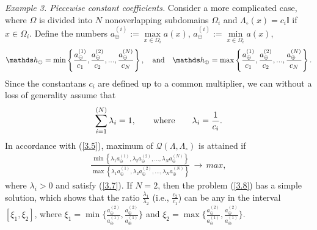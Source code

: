 \documentclass[amstex,amstext,amsfonts,epsf,12pt] {amsart}
\newcommand\be{\begin{eqnarray*}}
\newcommand\ee{\end{eqnarray*}}
\newcommand\ben{\begin{eqnarray}}
\newcommand\een{\end{eqnarray}}
\def\be{\begin{eqnarray*}}
\def\ee{\end{eqnarray*}}
\def\ben{\begin{eqnarray}}
\def\een{\end{eqnarray}}
\begin{document}
{\it Example 3. Piecewise constant coefficients.}
Consider a more complicated case, where $\Omega$ is divided into
$N$ nonoverlapping subdomains $\Omega_i$ and $\Lambda_\circ(x)=c_i{\mathbb I}$ if
 $x\in \Omega_i$. 
Define the numbers $a^{(i)}_\oplus:=\max\limits_{x\in \Omega_i} a(x)$,
 $a^{(i)}_\ominus:=\min\limits_{x\in \Omega_i} a(x)$,
\be 
{\mathds h}_\ominus=\min\left\{\frac{a^{(1)}_\ominus}{c_1},\frac{a^{(2)}_\ominus}{c_2},...,\frac{a^{(N)}_\ominus}{c_N}\right\},\quad{\rm and}\quad
{\mathds h}_\oplus=\max\left\{\frac{a^{(1)}_\oplus}{c_1},\frac{a^{(2)}_\oplus}{c_2},...,\frac{a^{(N)}_\oplus}{c_N}\right\}.
\ee
Since the constantans $c_i$ are defined up to a common multiplier,
we can without a loss of generality assume that
\ben
\label{3.7}
\sum^{(N)}_{i=1}\lambda_i=1, \qquad{\rm where}\qquad \lambda_i=\frac{1}{c_i}.
\een
In accordance with (\ref{3.5}),
maximum of ${\mathcal Q}(\Lambda,\Lambda_\circ)$ is attained
if
\ben
\label{3.8}
\frac{\min\left\{\lambda_1 a^{(1)}_\ominus,\lambda_2 a^{(2)}_\ominus,...,\lambda_N a^{(N)}_\ominus\right\}}
{\max\left\{\lambda_1 a^{(1)}_\oplus,\lambda_2 a^{(2)}_\oplus,...,\lambda_N a^{(N)}_\oplus\right\}}\,\rightarrow\,max,
\een
where $\lambda_i>0$ and satisfy (\ref{3.7}).
If $N=2$, then the problem (\ref{3.8}) has a simple solution, which shows that the ratio
$\frac{\lambda_1}{\lambda_2}$ (i.e., $\frac{c_2}{c_1}$) can be any in the interval
$[\xi_1,\xi_2]$, where
$\xi_1=\min\{\frac{a^{(2)}_\ominus}{a^{(1)}_\ominus},  \frac{a^{(2)}_\oplus}{a^{(1)}_\oplus} \} $ and
$\xi_2=\max\{\frac{a^{(2)}_\ominus}{a^{(1)}_\ominus},  \frac{a^{(2)}_\oplus}{a^{(1)}_\oplus} \} $.
\end{document}
